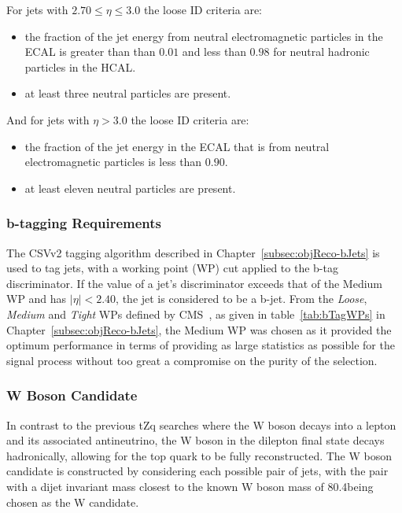 For jets with $ 2.70 \leq \eta \leq 3.0$ the loose ID criteria are:
\begin{itemize}
\item the fraction of the jet energy from neutral electromagnetic particles in the ECAL is greater than than $0.01$ and less than $0.98$ for neutral hadronic particles in the HCAL.
\item at least three neutral particles are present.
\end{itemize}

And for jets with $\eta > 3.0$ the loose ID criteria are:
\begin{itemize}
\item the fraction of the jet energy in the ECAL that is from neutral electromagnetic particles is less than $0.90$.
\item at least eleven neutral particles are present.
\end{itemize}

\subsubsection{b-tagging Requirements}
The CSVv2 tagging algorithm described in Chapter~\ref{subsec:objReco-bJets} is used to tag jets, with a working point (WP) cut applied to the b-tag discriminator.
If the value of a jet's discriminator exceeds that of the Medium WP and has $|\eta| < 2.40$, the jet is considered to be a b-jet.
From the \emph{Loose}, \emph{Medium} and \emph{Tight} WPs defined by CMS~\cite{Sirunyan:2017ezt}, as given in table~\ref{tab:bTagWPs} in Chapter~\ref{subsec:objReco-bJets}, the Medium WP was chosen as it provided the optimum performance in terms of providing as large statistics as possible for the signal process without too great a compromise on the purity of the selection.

\subsubsection{W Boson Candidate}
In contrast to the previous tZq searches where the W boson decays into a lepton and its associated antineutrino, the W boson in the dilepton final state decays hadronically, allowing for the top quark to be fully reconstructed.
The W boson candidate is constructed by considering each possible pair of jets, with the pair with a dijet invariant mass closest to the known W boson mass of 80.4\GeVcc being chosen as the W candidate.

